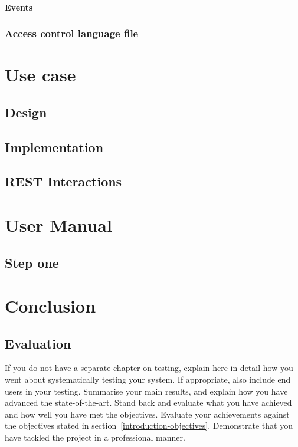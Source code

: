 \documentclass[a4paper,11pt]{report}
\begin{document}
\subsubsection{Events}
\subsection{Access control language file}


\chapter{Use case}
\label{usecase}

\section{Design}
\section{Implementation}
\section{REST Interactions}

\chapter{User Manual}
\label{usermanual}


\section{Step one}
\label{stepOne}
	 


\chapter{Conclusion}

\label{conclusion}

\section{Evaluation}

\label{conclusion-evaluation}

If you do not have a separate chapter on testing, explain here in detail how you
went about systematically testing your system. If appropriate, also include
end users in your testing. Summarise your main results, and explain how you have
advanced the state-of-the-art. Stand back and evaluate what you have achieved
and how well you have met the objectives. Evaluate your achievements against the
objectives stated in section~\ref{introduction-objectives}. Demonstrate that you
have tackled the project in a professional manner.
\end{document}
